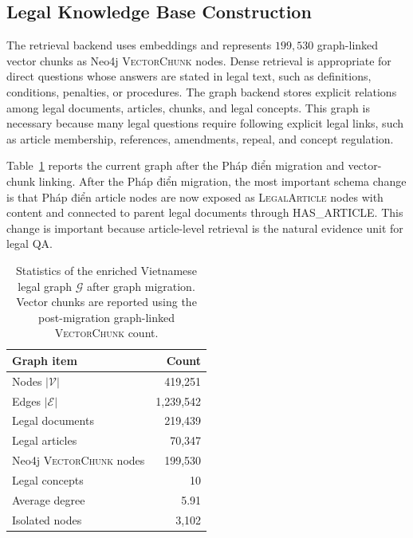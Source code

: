 \documentclass[11pt,twocolumn]{article}
\begin{document}
\subsection{Legal Knowledge Base Construction}
\label{subsec:legal_kb_construction}

The retrieval backend uses 
embeddings and represents $199{,}530$ graph-linked vector
chunks as Neo4j \textsc{VectorChunk} nodes. Dense retrieval is
appropriate for direct questions whose answers are stated in
legal text, such as definitions, conditions, penalties, or
procedures. The graph backend stores explicit relations among
legal documents, articles, chunks, and legal concepts. This
graph is necessary because many legal questions require
following explicit legal links, such as article membership,
references, amendments, repeal, and concept regulation.

Table~\ref{tab:graph_stats} reports the current graph after
the Pháp điển migration and vector-chunk linking. After the
Pháp điển migration, the most important schema change is that
Pháp điển article nodes are now exposed as
\textsc{LegalArticle} nodes with content and connected to
parent legal documents through \textsc{HAS\_ARTICLE}. This
change is important because article-level retrieval is the
natural evidence unit for legal QA.

\begin{table}[!htbp]
\centering
\caption{Statistics of the enriched Vietnamese legal graph $\mathcal{G}$ after graph migration. Vector chunks are reported using the post-migration graph-linked \textsc{VectorChunk} count.}
\label{tab:graph_stats}
\small
\begin{tabular}{lr}
\toprule
\textbf{Graph item} & \textbf{Count} \\
\midrule
Nodes $|\mathcal{V}|$ & 419,251 \\
Edges $|\mathcal{E}|$ & 1,239,542 \\
Legal documents & 219,439 \\
Legal articles & 70,347 \\
Neo4j \textsc{VectorChunk} nodes & 199,530 \\
Legal concepts & 10 \\
Average degree & 5.91 \\
Isolated nodes & 3,102 \\
\bottomrule
\end{tabular}
\end{table}
\end{document}
